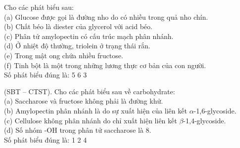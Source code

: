 \documentclass[12pt,a4paper]{article}
\begin{document}
\begin{ex}
Cho các phát biểu sau:\\
(a) Glucose được gọi là đường nho do có nhiều trong quả nho chín.\\
(b) Chất béo là diester của glycerol với acid béo.\\
(c) Phân tử amylopectin có cấu trúc mạch phân nhánh.\\
(d) Ở nhiệt độ thường, triolein ở trạng thái rắn.\\
(e) Trong mật ong chứa nhiều fructose.\\
(f) Tinh bột là một trong những lương thực cơ bản của con người.\\
Số phát biểu đúng là:
\choice
{5}
{6}
{3}
{}
\end{ex}

\begin{ex}
(SBT -- CTST). Cho các phát biểu sau về carbohydrate:\\
(a) Saccharose và fructose không phải là đường khử.\\
(b) Amylopectin phân nhánh là do sự xuất hiện của liên kết $\alpha$-1,6-glycoside.\\
(c) Cellulose không phân nhánh do chỉ xuất hiện liên kết $\beta$-1,4-glycoside.\\
(d) Số nhóm -OH trong phân tử saccharose là 8.\\
Số phát biểu đúng là:
\choice
{1}
{2}
{}
{4}
\end{ex}
\end{document}

